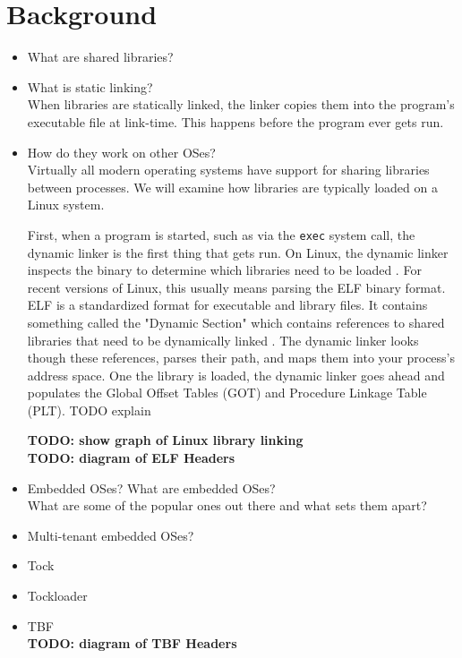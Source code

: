 \documentclass{article}
\begin{document}
\section*{Background}

\begin{itemize}
    \item What are shared libraries?
    \item What is static linking? \\
        When libraries are statically linked, the linker copies them into the program's executable file at link-time. This happens before the program ever gets run.
    \item How do they work on other OSes? \\
        Virtually all modern operating systems have support for sharing libraries between processes. We will examine how libraries are typically loaded on a Linux system.

        First, when a program is started, such as via the \texttt{exec} system call, the dynamic linker is the first thing that gets run. On Linux, the dynamic linker inspects the binary to determine which libraries need to be loaded \cite{ld.so}. For recent versions of Linux, this usually means parsing the ELF binary format. ELF is a standardized format for executable and library files. It contains something called the "Dynamic Section" which contains references to shared libraries that need to be dynamically linked \cite{ELF pg 78}. The dynamic linker looks though these references, parses their path, and maps them into your process's address space. One the library is loaded, the dynamic linker goes ahead and populates the Global Offset Tables (GOT) and Procedure Linkage Table (PLT). TODO explain


        \textbf{TODO: show graph of Linux library linking} \\
        \textbf{TODO: diagram of ELF Headers}
    \item Embedded OSes?
        What are embedded OSes? \\
        What are some of the popular ones out there and what sets them apart? \\
    \item Multi-tenant embedded OSes?
    \item Tock
    \item Tockloader
    \item TBF \\
        \textbf{TODO: diagram of TBF Headers}
\end{itemize}
\end{document}
